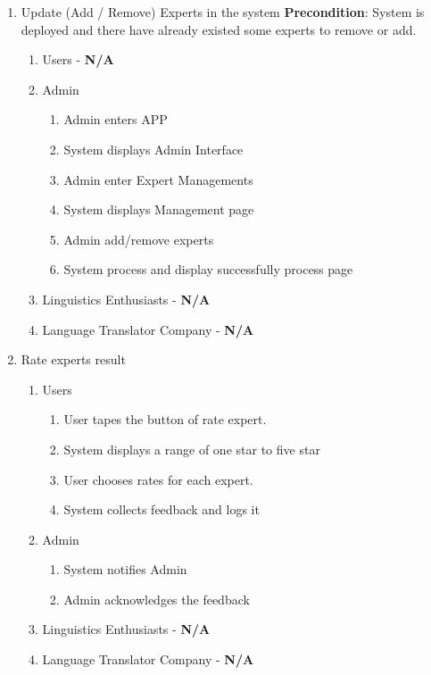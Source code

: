 \begin{enumerate}[{\bf BE1:}]
	\item Update (Add / Remove) Experts in the system 
	\textbf{Precondition}: System is deployed and there have already existed some experts to remove or add.
	\begin{enumerate}[{\bf VP1.}]
		\item Users - \textbf{N/A}
		\item Admin
		\begin{enumerate}
			\item Admin enters APP
			\item System displays Admin Interface
			\item Admin enter Expert Managements
			\item System displays Management page
			\item Admin add/remove experts
			\item System process and display successfully process page

		\end{enumerate}
		\item Linguistics Enthusiasts - \textbf{N/A}
		\item Language Translator Company - \textbf{N/A}
	\end{enumerate}


	\item Rate experts result 
	\begin{enumerate}[{\bf VP1.}]
		\item Users
		\begin{enumerate}[{\bf 1.}]
			\item User tapes the button of rate expert.
			\item System displays a range of one star to five star
			\item User chooses rates for each expert.
			\item System collects feedback and logs it
		\end{enumerate}
		\item Admin
		\begin{enumerate}[{\bf 6.}]
			\item System notifies Admin
			\item Admin acknowledges the feedback
		\end{enumerate}
		\item Linguistics Enthusiasts - \textbf{N/A}
		\item Language Translator Company - \textbf{N/A}
	\end{enumerate}
\end{enumerate}


